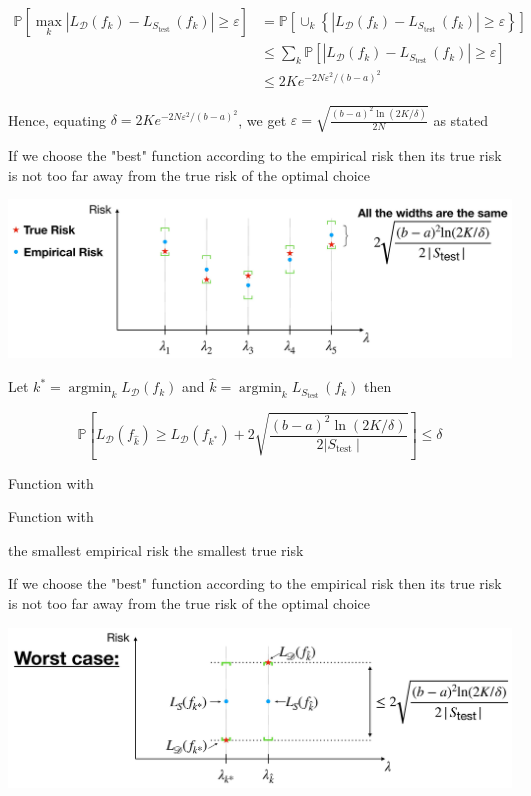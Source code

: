 \documentclass[10pt]{article}
\begin{document}
$$
\begin{aligned}
\mathbb{P}\left[\max _{k}\left|L_{\mathscr{D}}\left(f_{k}\right)-L_{S_{\text {test }}}\left(f_{k}\right)\right| \geq \varepsilon\right] & =\mathbb{P}\left[\cup_{k}\left\{\left|L_{\mathscr{D}}\left(f_{k}\right)-L_{S_{\text {test }}}\left(f_{k}\right)\right| \geq \varepsilon\right\}\right] \\
& \leq \sum_{k} \mathbb{P}\left[\left|L_{\mathscr{D}}\left(f_{k}\right)-L_{S_{\text {test }}}\left(f_{k}\right)\right| \geq \varepsilon\right] \\
& \leq 2 K e^{-2 N \varepsilon^{2} /(b-a)^{2}}
\end{aligned}
$$

Hence, equating $\delta=2 K e^{-2 N \varepsilon^{2} /(b-a)^{2}}$, we get $\varepsilon=\sqrt{\frac{(b-a)^{2} \ln (2 K / \delta)}{2 N}}$ as stated

If we choose the "best" function according to the empirical risk then its true risk is not too far away from the true risk of the optimal choice

\begin{center}
\includegraphics[max width=\textwidth]{2023_12_30_b4c98a1755bce7fa9493g-21}
\end{center}

Let $k^{*}=\operatorname{argmin}_{k} L_{\mathscr{D}}\left(f_{k}\right)$ and $\hat{k}=\operatorname{argmin}_{k} L_{S_{\text {test }}}\left(f_{k}\right)$ then

$$
\mathbb{P}\left[L_{\mathscr{D}}\left(f_{\hat{k}}\right) \geq L_{\mathscr{D}}\left(f_{k^{*}}\right)+2 \sqrt{\frac{(b-a)^{2} \ln (2 K / \delta)}{2\left|S_{\text {test }}\right|}}\right] \leq \delta
$$

Function with

Function with

the smallest empirical risk the smallest true risk

If we choose the "best" function according to the empirical risk then its true risk is not too far away from the true risk of the optimal choice

\begin{center}
\includegraphics[max width=\textwidth]{2023_12_30_b4c98a1755bce7fa9493g-22}
\end{center}
\end{document}
